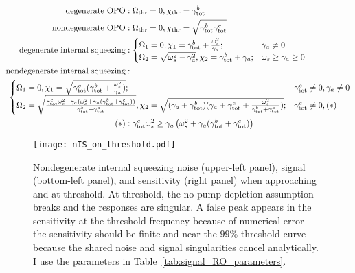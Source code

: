 \begin{align}\label{eq:singularity_threshold}
\text{degenerate OPO}&: \Omega_\text{thr}=0, \chi_\text{thr}=\gamma^b_\mathrm{tot}\\
\text{nondegenerate OPO}&: \Omega_\text{thr}=0, \chi_\text{thr}=\sqrt{\gamma^b_\mathrm{tot}\gamma^c_\text{tot}}\\
\text{degenerate internal squeezing}&:\begin{cases}
\Omega_1=0, \chi_1=\gamma^b_\mathrm{tot}+\frac{\omega_s^2}{\gamma_a};&\gamma_a\neq0\\
\Omega_2=\sqrt{\omega_s^2-\gamma_a^2}, \chi_2=\gamma^b_\mathrm{tot}+\gamma_a;&\omega_s\geq\gamma_a\geq0
\end{cases}\\
\text{nondegenerate internal squeezing}&:\nonumber\\&\hspace{-5cm}\begin{cases}
\Omega_1=0, \chi_1=\sqrt{\gamma^c_\text{tot}(\gamma^b_\mathrm{tot}+\frac{\omega_s^2}{\gamma_a})};&\gamma^c_\text{tot}\neq0,\gamma_a\neq0\\
\Omega_2=\sqrt{\frac{\gamma^c_\text{tot}\omega_s^2-\gamma_a(\omega_s^2+\gamma_a(\gamma^b_\mathrm{tot}+\gamma^c_\text{tot}))}{\gamma^b_\mathrm{tot}+\gamma^c_\text{tot}}}, \chi_2=\sqrt{(\gamma_a+\gamma^b_\mathrm{tot})(\gamma_a+\gamma^c_\text{tot}+\frac{\omega_s^2}{\gamma^b_\mathrm{tot}+\gamma^c_\text{tot}})};&\gamma^c_\text{tot}\neq0,(*)
\end{cases}\nonumber\\
(*)&:\gamma^c_\text{tot}\omega_s^2\geq\gamma_a\left(\omega_s^2+\gamma_a(\gamma^b_\mathrm{tot}+\gamma^c_\text{tot})\right)
\end{align}
\endgroup

\begin{figure}
    \centering
    \texttt{[image: nIS\_on\_threshold.pdf]}
    \caption{Nondegenerate internal squeezing noise (upper-left panel), signal (bottom-left panel), and sensitivity (right panel) when approaching and at threshold. At threshold, the no-pump-depletion assumption breaks and the responses are singular. A false peak appears in the sensitivity at the threshold frequency because of numerical error -- the sensitivity should be finite and near the $99\%$ threshold curve because the shared noise and signal singularities cancel analytically. I use the parameters in Table~\ref{tab:signal_RO_parameters}. %
    }
    \label{fig:nIS_on_threshold}
\end{figure}

